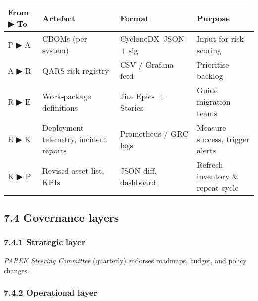 \documentclass[
  english,
]{article}
\begin{document}
\begin{longtable}[]{@{}
  >{\raggedright\arraybackslash}p{}
  >{\raggedright\arraybackslash}p{}
  >{\raggedright\arraybackslash}p{}
  >{\raggedright\arraybackslash}p{}@{}}
\toprule\noalign{}
\begin{minipage}[b]{\linewidth}\raggedright
From ▶ To
\end{minipage} & \begin{minipage}[b]{\linewidth}\raggedright
Artefact
\end{minipage} & \begin{minipage}[b]{\linewidth}\raggedright
Format
\end{minipage} & \begin{minipage}[b]{\linewidth}\raggedright
Purpose
\end{minipage} \\
\midrule\noalign{}
\endhead
\bottomrule\noalign{}
\endlastfoot
P ▶ A & CBOMs (per system) & CycloneDX~JSON + sig & Input for risk
scoring \\
A ▶ R & QARS risk registry & CSV / Grafana feed & Prioritise backlog \\
R ▶ E & Work‑package definitions & Jira Epics~+ Stories & Guide
migration teams \\
E ▶ K & Deployment telemetry, incident reports & Prometheus / GRC logs &
Measure success, trigger alerts \\
K ▶ P & Revised asset list, KPIs & JSON diff, dashboard & Refresh
inventory \& repeat cycle \\
\end{longtable}

\subsection{7.4 Governance layers}\label{governance-layers}

\subsubsection{7.4.1 Strategic layer}\label{strategic-layer}

\emph{PAREK Steering Committee} (quarterly) endorses roadmaps, budget,
and policy changes.

\subsubsection{7.4.2 Operational layer}\label{operational-layer}
\end{document}
